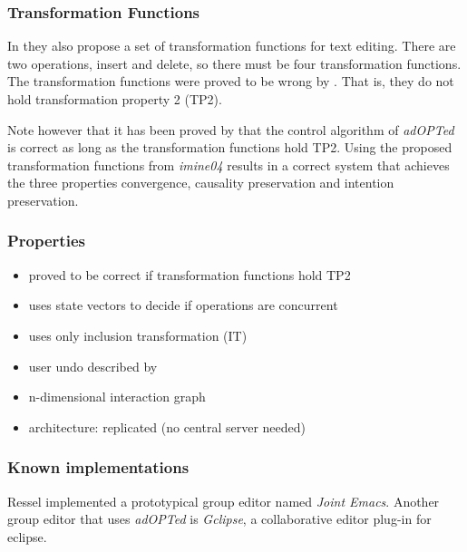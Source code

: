 \subsubsection{Transformation Functions}
In \cite{ressel96} they also propose a set of transformation functions for text editing. There are two operations, insert and delete, so there must be four transformation functions. The transformation functions were proved to be wrong by \cite{imine03}. That is, they do not hold transformation property 2 (TP2). 

Note however that it has been proved by \cite{cormack02} that the control algorithm of \emph{adOPTed} is correct as long as the transformation functions hold TP2. Using the proposed transformation functions from \emph{imine04} results in a correct system that achieves the three properties convergence, causality preservation and intention preservation.


\subsubsection{Properties}
\begin{itemize}
 \item proved to be correct if transformation functions hold TP2
 \item uses state vectors to decide if operations are concurrent
 \item uses only inclusion transformation (IT)
 \item user undo described by \cite{ressel99}
 \item n-dimensional interaction graph
 \item architecture: replicated (no central server needed)
\end{itemize}


\subsubsection{Known implementations}
Ressel implemented a prototypical group editor named \emph{Joint Emacs}. Another group editor that uses \emph{adOPTed} is \emph{Gclipse}, a collaborative editor plug-in for eclipse.
